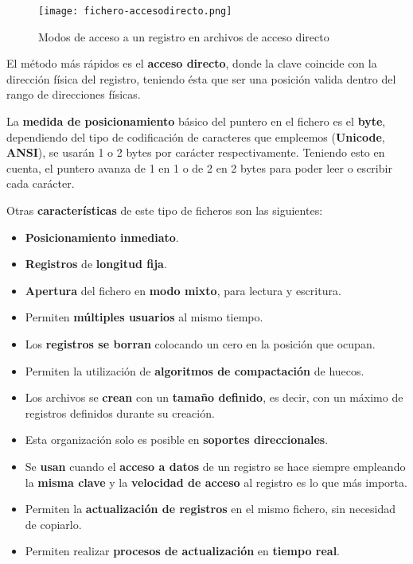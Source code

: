 \begin{figure}[ht]
     \centering
     \texttt{[image: fichero-accesodirecto.png]}
     \caption{Modos de acceso a un registro en archivos de acceso directo}
 \end{figure}

El método más rápidos es el \textbf{acceso directo}, donde la clave coincide con la dirección física del registro, teniendo ésta que ser una posición valida dentro del rango de direcciones físicas.

La \textbf{medida de posicionamiento} básico del puntero en el fichero es el \textbf{byte}, dependiendo del tipo de codificación de caracteres que empleemos (\textbf{\gls{Unicode}}, \textbf{\gls{ANSI}}), se usarán 1 o 2 bytes por carácter respectivamente. Teniendo esto en cuenta, el puntero avanza de 1 en 1 o de 2 en 2 bytes para poder leer o escribir cada carácter.

Otras \textbf{características} de este tipo de ficheros son las siguientes:

\begin{itemize}
    \item \textbf{Posicionamiento inmediato}.
    \item \textbf{Registros} de \textbf{longitud fija}.
    \item \textbf{Apertura} del fichero en \textbf{modo mixto}, para lectura y escritura.
    \item Permiten \textbf{múltiples usuarios} al mismo tiempo.
    \item Los \textbf{registros se borran} colocando un cero en la posición que ocupan.
    \item Permiten la utilización de \textbf{algoritmos de compactación} de huecos.
    \item Los archivos se \textbf{crean} con un \textbf{tamaño definido}, es decir, con un máximo de registros definidos durante su creación.
    \item Esta organización solo es posible en \textbf{soportes direccionales}.
    \item Se \textbf{usan} cuando el \textbf{acceso a datos} de un registro se hace siempre empleando la \textbf{misma clave} y la \textbf{velocidad de acceso} al registro es lo que más importa.
    \item Permiten la \textbf{actualización de registros} en el mismo fichero, sin necesidad de copiarlo.
    \item Permiten realizar \textbf{procesos de actualización} en \textbf{tiempo real}.
\end{itemize}

